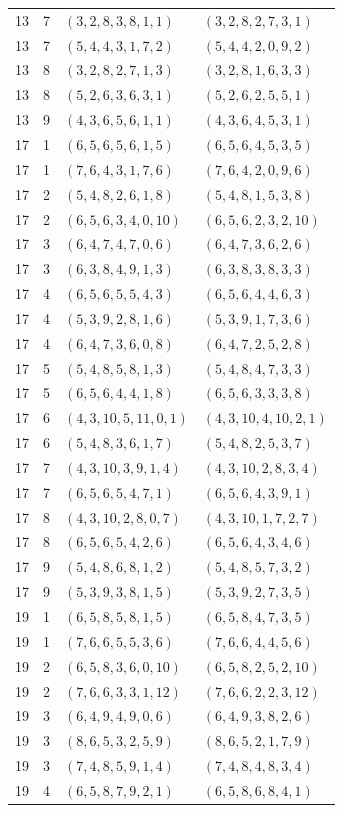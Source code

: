 \begin{longtable}{rrll}
13&7&$(3,2,8,3,8,1,1)$&$(3,2,8,2,7,3,1)$\\
13&7&$(5,4,4,3,1,7,2)$&$(5,4,4,2,0,9,2)$\\
13&8&$(3,2,8,2,7,1,3)$&$(3,2,8,1,6,3,3)$\\
13&8&$(5,2,6,3,6,3,1)$&$(5,2,6,2,5,5,1)$\\
13&9&$(4,3,6,5,6,1,1)$&$(4,3,6,4,5,3,1)$\\
17&1&$(6,5,6,5,6,1,5)$&$(6,5,6,4,5,3,5)$\\
17&1&$(7,6,4,3,1,7,6)$&$(7,6,4,2,0,9,6)$\\
17&2&$(5,4,8,2,6,1,8)$&$(5,4,8,1,5,3,8)$\\
17&2&$(6,5,6,3,4,0,10)$&$(6,5,6,2,3,2,10)$\\
17&3&$(6,4,7,4,7,0,6)$&$(6,4,7,3,6,2,6)$\\
17&3&$(6,3,8,4,9,1,3)$&$(6,3,8,3,8,3,3)$\\
17&4&$(6,5,6,5,5,4,3)$&$(6,5,6,4,4,6,3)$\\
17&4&$(5,3,9,2,8,1,6)$&$(5,3,9,1,7,3,6)$\\
17&4&$(6,4,7,3,6,0,8)$&$(6,4,7,2,5,2,8)$\\
17&5&$(5,4,8,5,8,1,3)$&$(5,4,8,4,7,3,3)$\\
17&5&$(6,5,6,4,4,1,8)$&$(6,5,6,3,3,3,8)$\\
17&6&$(4,3,10,5,11,0,1)$&$(4,3,10,4,10,2,1)$\\
17&6&$(5,4,8,3,6,1,7)$&$(5,4,8,2,5,3,7)$\\
17&7&$(4,3,10,3,9,1,4)$&$(4,3,10,2,8,3,4)$\\
17&7&$(6,5,6,5,4,7,1)$&$(6,5,6,4,3,9,1)$\\
17&8&$(4,3,10,2,8,0,7)$&$(4,3,10,1,7,2,7)$\\
17&8&$(6,5,6,5,4,2,6)$&$(6,5,6,4,3,4,6)$\\
17&9&$(5,4,8,6,8,1,2)$&$(5,4,8,5,7,3,2)$\\
17&9&$(5,3,9,3,8,1,5)$&$(5,3,9,2,7,3,5)$\\
19&1&$(6,5,8,5,8,1,5)$&$(6,5,8,4,7,3,5)$\\
19&1&$(7,6,6,5,5,3,6)$&$(7,6,6,4,4,5,6)$\\
19&2&$(6,5,8,3,6,0,10)$&$(6,5,8,2,5,2,10)$\\
19&2&$(7,6,6,3,3,1,12)$&$(7,6,6,2,2,3,12)$\\
19&3&$(6,4,9,4,9,0,6)$&$(6,4,9,3,8,2,6)$\\
19&3&$(8,6,5,3,2,5,9)$&$(8,6,5,2,1,7,9)$\\
19&3&$(7,4,8,5,9,1,4)$&$(7,4,8,4,8,3,4)$\\
19&4&$(6,5,8,7,9,2,1)$&$(6,5,8,6,8,4,1)$\\

\end{longtable}
